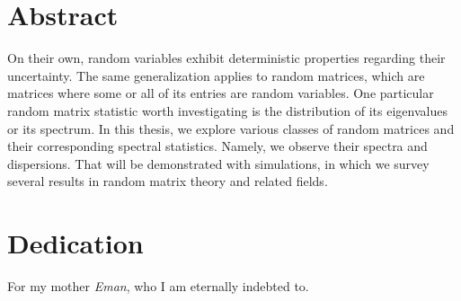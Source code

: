 \documentclass[12pt,twoside]{reedthesis}
\begin{document}

    \chapter*{Abstract}
	On their own, random variables exhibit deterministic properties regarding their uncertainty.
	The same generalization applies to random matrices, which are matrices where some or all of its entries are random variables.
	One particular random matrix statistic worth investigating is the distribution of its eigenvalues or its spectrum.
	In this thesis, we explore various classes of random matrices and their corresponding spectral statistics. Namely, we observe their spectra and dispersions.
	That will be demonstrated with simulations, in which we survey several results in random matrix theory and related fields.

	\chapter*{Dedication}
  \vspace{15em}
  \begin{center}
    For my mother \textit{Eman}, who I am eternally indebted to.
  \end{center}

  \mainmatter %
  \pagestyle{fancyplain} %











    \appendix
      
      
      
      


  \backmatter %
\end{document}
